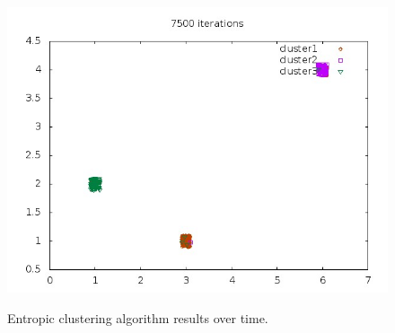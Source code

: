 \documentclass[english]{article}
\begin{document}
\begin{figure}
{\includegraphics[scale=0.25]{clusters3.jpeg}}\hfill{}\protect\caption{Entropic clustering algorithm results over time.}
\end{figure}
\end{document}
